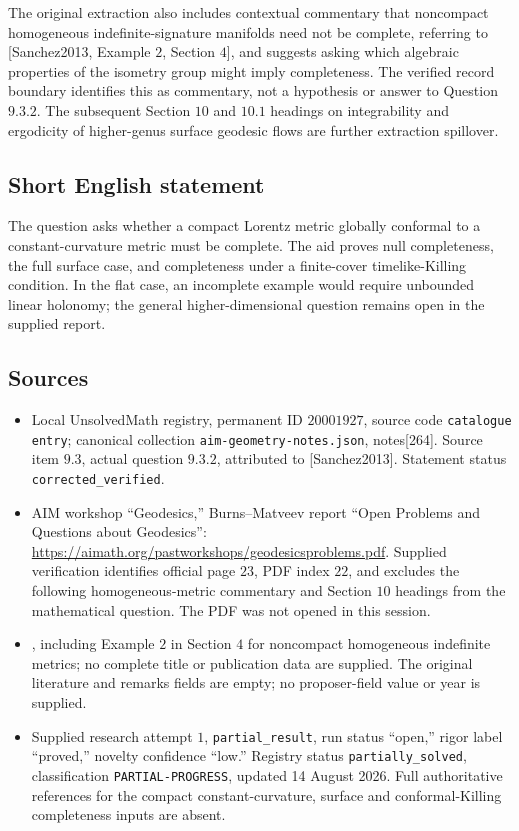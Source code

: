 \documentclass[11pt]{article}
\begin{document}
The original extraction also includes contextual commentary that noncompact homogeneous indefinite-signature manifolds need not be complete, referring to [Sanchez2013, Example \(2\), Section \(4\)], and suggests asking which algebraic properties of the isometry group might imply completeness. The verified record boundary identifies this as commentary, not a hypothesis or answer to Question \(9.3.2\). The subsequent Section \(10\) and \(10.1\) headings on integrability and ergodicity of higher-genus surface geodesic flows are further extraction spillover.
\subsection{Short English statement}
The question asks whether a compact Lorentz metric globally conformal to a constant-curvature metric must be complete. The aid proves null completeness, the full surface case, and completeness under a finite-cover timelike-Killing condition. In the flat case, an incomplete example would require unbounded linear holonomy; the general higher-dimensional question remains open in the supplied report.
\subsection{Sources}
\begin{itemize}
\item Local UnsolvedMath registry, permanent ID \(20001927\), source code \texttt{catalogue entry}; canonical collection \texttt{aim-geometry-notes.json}, notes[264]. Source item \(9.3\), actual question \(9.3.2\), attributed to [Sanchez2013]. Statement status \texttt{corrected\_verified}.
\item AIM workshop ``Geodesics,'' Burns--Matveev report ``Open Problems and Questions about Geodesics'': \url{https://aimath.org/pastworkshops/geodesicsproblems.pdf}. Supplied verification identifies official page \(23\), PDF index \(22\), and excludes the following homogeneous-metric commentary and Section \(10\) headings from the mathematical question. The PDF was not opened in this session.
\item [Sanchez2013], including Example \(2\) in Section \(4\) for noncompact homogeneous indefinite metrics; no complete title or publication data are supplied. The original literature and remarks fields are empty; no proposer-field value or year is supplied.
\item Supplied research attempt \(1\), \texttt{partial\_result}, run status ``open,'' rigor label ``proved,'' novelty confidence ``low.'' Registry status \texttt{partially\_solved}, classification \texttt{PARTIAL-PROGRESS}, updated 14 August 2026. Full authoritative references for the compact constant-curvature, surface and conformal-Killing completeness inputs are absent.
\end{itemize}
\end{document}
